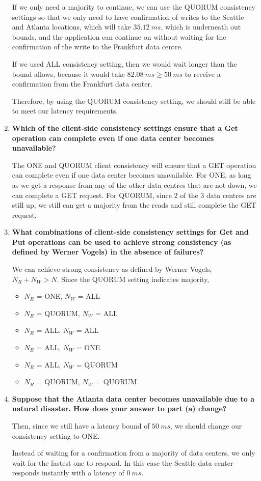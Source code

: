 \documentclass[12pt,a4paper]{article}
\begin{document}
\begin{enumerate}[label=(\alph*)]
If we only need a majority to continue, we can use the QUORUM consistency settings so that we only need to have confirmation of writes to the Seattle and Atlanta locations, which will take $35.12\ ms$, which is underneath out bounds, and the application can continue on without waiting for the confirmation of the write to the Frankfurt data centre. 

If we used ALL consistency setting, then we would wait longer than the bound allows, because it would take $82.08\ ms \ge 50\ ms$ to receive a confirmation from the Frankfurt data center. 

Therefore, by using the QUORUM consistency setting, we should still be able to meet our latency requirements.


\item \textbf{Which of the client-side consistency settings ensure that a Get operation can complete even if one data center becomes unavailable?}

The ONE and QUORUM client consistency will ensure that a GET operation can complete even if one data center becomes unavailable. For ONE, as long as we get a response from any of the other data centres that are not down, we can complete a GET request. For QUORUM, since 2 of the 3 data centres are still up, we still can get a majority from the reads and still complete the GET request.

\pagebreak

\item \textbf{What combinations of client-side consistency settings for Get and Put operations can be used to achieve strong consistency (as defined by Werner Vogels) in the absence of failures?}

We can achieve strong consistency as defined by Werner Vogels, $N_R + N_W > N$. Since the QUORUM setting indicates majority, 

\begin{itemize}
\item $N_R$ = ONE, $N_W$ = ALL
\item $N_R$ = QUORUM, $N_W$ = ALL
\item $N_R$ = ALL, $N_W$ = ALL
\item $N_R$ = ALL, $N_W$ = ONE
\item $N_R$ = ALL, $N_W$ = QUORUM
\item $N_R$ = QUORUM, $N_W$ = QUORUM
\end{itemize}

\item \textbf{Suppose that the Atlanta data center becomes unavailable due to a natural disaster. How does your answer to part (a) change?}

Then, since we still have a latency bound of $50\ ms$, we should change our consistency setting to ONE. 

Instead of waiting for a confirmation from a majority of data centers, we only wait for the fastest one to respond. In this case the Seattle data center responds instantly with a latency of $0\ ms$. 

\end{enumerate}
\end{document}

